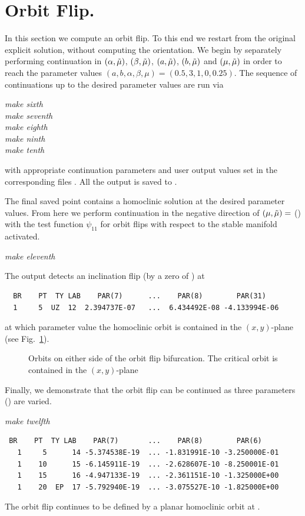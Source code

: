 \documentclass[12pt]{report}
\begin{document}
\section{Orbit Flip.}
In this section we compute an orbit flip. To this end we restart
from the original explicit solution, without computing the orientation. We 
begin by separately performing continuation in $(\alpha,\tilde \mu)$, 
$(\beta,\tilde \mu)$, $(a,\tilde \mu)$, $(b,\tilde \mu)$ and $(\mu, \tilde \mu)$
in order to reach the parameter values 
$(a,b,\alpha,\beta, \mu)=(0.5,3,1,0,0.25)$.
The sequence of continuations up to the desired parameter values 
are run via
\begin{center}
\it make sixth\\
make seventh\\
make eighth\\
make ninth\\ 
make tenth\\
\end{center}
with appropriate continuation parameters and user output values
set in the corresponding files . 
All the output is saved to .

The final saved point  contains a homoclinic solution at
the desired parameter values. From here we perform continuation in
the negative direction of $(\mu,\tilde \mu)=$ () with
the test function $\psi_{11}$ for orbit flips with respect to the
stable manifold activated.
\begin{center}
\it make eleventh
\end{center}
The output detects an inclination flip (by a zero of ) 
at  
\begin{verbatim}
  BR    PT  TY LAB    PAR(7)      ...    PAR(8)        PAR(31)    
  1     5  UZ  12  2.394737E-07   ...  6.434492E-08 -4.133994E-06
\end{verbatim}
at which parameter value the homoclinic orbit is contained in the $(x,y)$-plane
(see Fig.\ \ref{Ftest2}).

\begin{figure}[t]
\epsfysize 9.0cm
\centerline{}
\caption{Orbits on either side of the orbit flip bifurcation. The critical
orbit is contained in the $(x,y)$-plane}
\label{Ftest2}
\end{figure}

Finally, we demonstrate that the orbit flip can be continued as 
three parameters () are varied. 
\begin{center}
\it make twelfth
\end{center}
\begin{verbatim}
 BR    PT  TY LAB    PAR(7)       ...    PAR(8)        PAR(6)     
   1     5      14 -5.374538E-19  ... -1.831991E-10 -3.250000E-01
   1    10      15 -6.145911E-19  ... -2.628607E-10 -8.250001E-01
   1    15      16 -4.947133E-19  ... -2.361151E-10 -1.325000E+00
   1    20  EP  17 -5.792940E-19  ... -3.075527E-10 -1.825000E+00
\end{verbatim}
The orbit flip continues to be defined by a planar homoclinic orbit
at .
\end{document}

